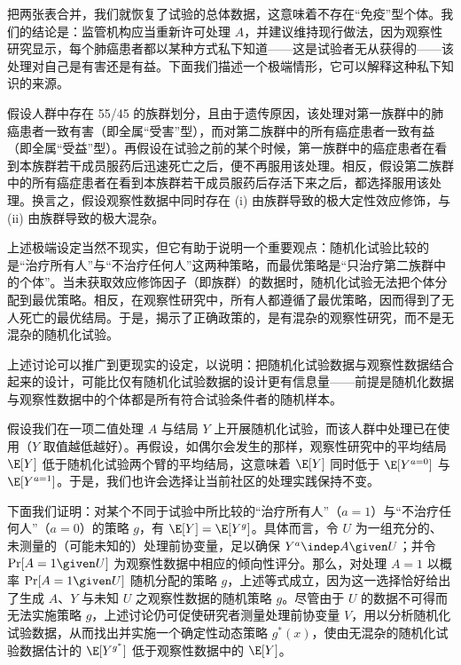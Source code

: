 \begin{finepoint}[随机化试验与观察性研究的一个反直觉比较]
把两张表合并，我们就恢复了试验的总体数据，这意味着不存在“免疫”型个体。我们的结论是：监管机构应当重新许可处理 $A$，并建议维持现行做法，因为观察性研究显示，每个肺癌患者都以某种方式私下知道——这是试验者无从获得的——该处理对自己是有害还是有益。下面我们描述一个极端情形，它可以解释这种私下知识的来源。

假设人群中存在 55/45 的族群划分，且由于遗传原因，该处理对第一族群中的肺癌患者一致有害（即全属“受害”型），而对第二族群中的所有癌症患者一致有益（即全属“受益”型）。再假设在试验之前的某个时候，第一族群中的癌症患者在看到本族群若干成员服药后迅速死亡之后，便不再服用该处理。相反，假设第二族群中的所有癌症患者在看到本族群若干成员服药后存活下来之后，都选择服用该处理。换言之，假设观察性数据中同时存在 (i) 由族群导致的极大定性效应修饰，与 (ii) 由族群导致的极大混杂。

上述极端设定当然不现实，但它有助于说明一个重要观点：随机化试验比较的是“治疗所有人”与“不治疗任何人”这两种策略，而最优策略是“只治疗第二族群中的个体”。当未获取效应修饰因子（即族群）的数据时，随机化试验无法把个体分配到最优策略。相反，在观察性研究中，所有人都遵循了最优策略，因而得到了无人死亡的最优结局。于是，揭示了正确政策的，是有混杂的观察性研究，而不是无混杂的随机化试验。
\end{finepoint}

\begin{finepoint}
上述讨论可以推广到更现实的设定，以说明：把随机化试验数据与观察性数据结合起来的设计，可能比仅有随机化试验数据的设计更有信息量——前提是随机化数据与观察性数据中的个体都是所有符合试验条件者的随机样本。

假设我们在一项二值处理 $A$ 与结局 $Y$ 上开展随机化试验，而该人群中处理已在使用（$Y$ 取值越低越好）。再假设，如偶尔会发生的那样，观察性研究中的平均结局 $\E[Y]$ 低于随机化试验两个臂的平均结局，这意味着 $\E[Y]$ 同时低于 $\E[Y^{a=0}]$ 与 $\E[Y^{a=1}]$。于是，我们也许会选择让当前社区的处理实践保持不变。

下面我们证明：对某个不同于试验中所比较的“治疗所有人”（$a=1$）与“不治疗任何人”（$a=0$）的策略 $g$，有 $\E[Y]=\E[Y^{g}]$。具体而言，令 $U$ 为一组充分的、未测量的（可能未知的）处理前协变量，足以确保 $Y^{a}\indep A\given U$；并令 $\Pr[A=1\given U]$ 为观察性数据中相应的倾向性评分。那么，对处理 $A=1$ 以概率 $\Pr[A=1\given U]$ 随机分配的策略 $g$，上述等式成立，因为这一选择恰好给出了生成 $A$、$Y$ 与未知 $U$ 之观察性数据的随机策略 $g$。尽管由于 $U$ 的数据不可得而无法实施策略 $g$，上述讨论仍可促使研究者测量处理前协变量 $V$，用以分析随机化试验数据，从而找出并实施一个确定性动态策略 $g^{*}(x)$，使由无混杂的随机化试验数据估计的 $\E[Y^{g^{*}}]$ 低于观察性数据中的 $\E[Y]$。
\end{finepoint}

